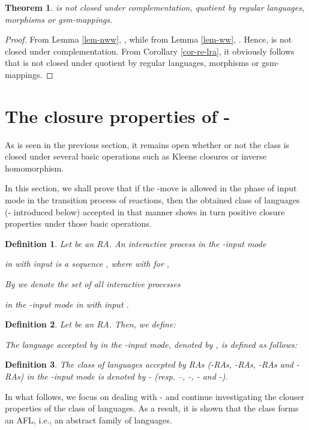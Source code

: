 \documentclass[preprint,fleqn,1p]{elsarticle}
\newtheorem{thm}{Theorem}
\newtheorem{de}{Definition}
\begin{document}
\begin{thm}
 is not closed under complementation, quotient by regular languages, morphisms or gsm-mappings.
\end{thm}

\begin{proof}
From Lemma \ref{lem-nww}, , while from Lemma \ref{lem-ww}, . Hence,  is not closed under complementation. From Corollary \ref{cor-re-lra}, it obviously follows that  is not closed under quotient by regular languages, morphisms or gsm-mappings.
\end{proof}


\section{The closure properties of -}

As is seen in the previous section, it remains open whether or not 
the class  is closed under several basic operations 
such as Kleene closures  or inverse homomorphism. 

In this section, we shall prove that if the -move is allowed in the phase of input mode in the transition process of 
reactions, then  the obtained class of languages (- introduced below) accepted in that manner shows in turn positive closure properties under  those basic operations. 


\begin{de}{\rm 
Let  be an RA. An interactive process} \it{in the -input mode} \rm{in  with input  is a sequence  
, where  with  for ,

By  we denote the set of all interactive processes} \it{in the -input mode} \rm{in  with input .}
\end{de}

\begin{de}{\rm 
Let  be an RA. Then, we define: 

The {\it language accepted by}  {\it in the -input mode}, denoted by 
, is defined as follows:
}
\end{de}

\begin{de}{\rm 
The class of languages accepted by RAs (-RAs, -RAs,  -RAs and -RAs)} \it{in the -input mode} {\rm  is denoted by - 
(resp. --, -, - and -). 
}
\end{de}

In what follows, we focus on dealing with - and continue investigating the clouser properties of the class of languages. 
As a result, it is shown that the class forms an AFL, i.e., an abstract family of languages. 
\end{document}

